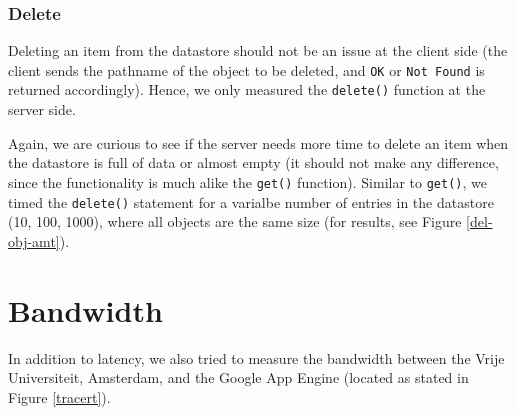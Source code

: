 
\subsubsection{Delete}
Deleting an item from the datastore should not be an issue at the client side
(the client sends the pathname of the object to be deleted, and \texttt{OK} or
\texttt{Not Found} is returned accordingly). Hence, we only measured the
\texttt{delete()} function at the server side. 

Again, we are curious to see if the server needs more time to delete an item
when the datastore is full of data or almost empty (it should not make any
difference, since the functionality is much alike the \texttt{get()} function).
Similar to \texttt{get()}, we timed the \texttt{delete()} statement for a
varialbe number of entries in the datastore (10, 100, 1000), where all objects
are the same size (for results, see Figure \ref{del-obj-amt}).


\section{Bandwidth}
In addition to latency, we also tried to measure the bandwidth between the
Vrije Universiteit, Amsterdam, and the Google App Engine (located as stated in
Figure \ref{tracert}).

